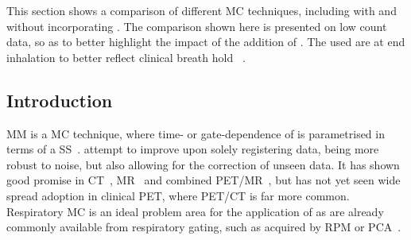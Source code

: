         This section shows a comparison of different \gls{MC} techniques, including with and without incorporating . The comparison shown here is presented on low count data, so as to better highlight the impact of the addition of . The  used are at end inhalation to better reflect clinical breath hold ~\parencite{Whitehead2021ComparisonMap}.
        
        \subsection{Introduction} \label{sec:comparison_of_motion_correction_methods_incorporating_motion_modelling_for_pet/ct_using_a_single_breath_hold_attenuation_map_introduction}
            \gls{MM} is a \gls{MC} technique, where time- or gate-dependence of  is parametrised in terms of a \gls{SS}~\parencite{McClelland2013}.  attempt to improve upon solely registering data, being more robust to noise, but also allowing for the correction of unseen data. It has shown good promise in \gls{CT}~\parencite{Li2007EnhancedModel}, \gls{MR}~\parencite{Manke2002RespiratoryModels} and combined \gls{PET}/\gls{MR}~\parencite{Manber2016JointCorrection.}, but has not yet seen wide spread adoption in clinical \gls{PET}, where \gls{PET}/\gls{CT} is far more common. Respiratory \gls{MC} is an ideal problem area for the application of  as  are already commonly available from respiratory gating, such as acquired by \gls{RPM} or \gls{PCA}~\parencite{Thielemans2011}.
            
